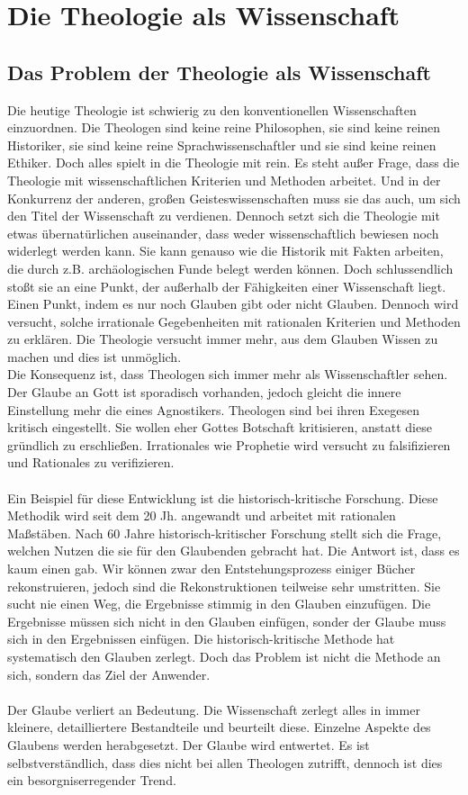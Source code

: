 \part{Die Theologie als Wissenschaft}
\chapter{Das Problem der Theologie als Wissenschaft}
Die heutige Theologie ist schwierig zu den konventionellen Wissenschaften einzuordnen. Die Theologen sind keine reine Philosophen, sie sind keine reinen Historiker, sie sind keine reine Sprachwissenschaftler und sie sind keine reinen Ethiker. Doch alles spielt in die Theologie mit rein. Es steht außer Frage, dass die Theologie mit wissenschaftlichen Kriterien und Methoden arbeitet. Und in der Konkurrenz der anderen, großen Geisteswissenschaften muss sie das auch, um sich den Titel der Wissenschaft zu verdienen. Dennoch setzt sich die Theologie mit etwas übernatürlichen auseinander, dass weder wissenschaftlich bewiesen noch widerlegt werden kann. Sie kann genauso wie die Historik mit Fakten arbeiten, die durch z.B. archäologischen Funde belegt werden können. Doch schlussendlich stoßt sie an eine Punkt, der außerhalb der Fähigkeiten einer Wissenschaft liegt. Einen Punkt, indem es nur noch Glauben gibt oder nicht Glauben. Dennoch wird versucht, solche irrationale Gegebenheiten mit rationalen Kriterien und Methoden zu erklären. Die Theologie versucht immer mehr, aus dem Glauben Wissen zu machen und dies ist unmöglich.
\\ 
Die Konsequenz ist, dass Theologen sich immer mehr als Wissenschaftler sehen. Der Glaube an Gott ist sporadisch vorhanden, jedoch gleicht die innere Einstellung mehr die eines Agnostikers. Theologen sind bei ihren Exegesen kritisch eingestellt. Sie wollen eher Gottes Botschaft kritisieren, anstatt diese gründlich zu erschließen. Irrationales wie Prophetie wird versucht zu falsifizieren und Rationales zu verifizieren. 
\\ ~ \\
Ein Beispiel für diese Entwicklung ist die historisch-kritische Forschung. Diese Methodik wird seit dem 20 Jh. angewandt und arbeitet mit rationalen Maßstäben. Nach 60 Jahre historisch-kritischer Forschung stellt sich die Frage, welchen Nutzen die sie für den Glaubenden gebracht hat. Die Antwort ist, dass es kaum einen gab. Wir können zwar den Entstehungsprozess einiger Bücher rekonstruieren, jedoch sind die Rekonstruktionen teilweise sehr umstritten. Sie sucht nie einen Weg, die Ergebnisse stimmig in den Glauben einzufügen. Die Ergebnisse müssen sich nicht in den Glauben einfügen, sonder der Glaube muss sich in den Ergebnissen einfügen. Die historisch-kritische Methode hat systematisch den Glauben zerlegt. Doch das Problem ist nicht die Methode an sich, sondern das Ziel der Anwender. 
\\ ~ \\
Der Glaube verliert an Bedeutung. Die Wissenschaft zerlegt alles in immer kleinere, detailliertere Bestandteile und beurteilt diese. Einzelne Aspekte des Glaubens werden herabgesetzt. Der Glaube wird entwertet. Es ist selbstverständlich, dass dies nicht bei allen Theologen zutrifft, dennoch ist dies ein besorgniserregender Trend.

